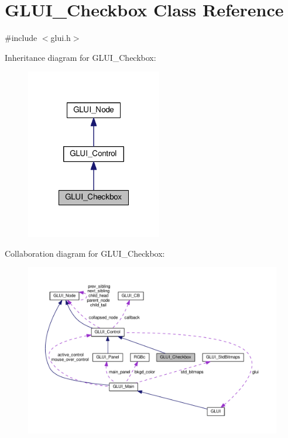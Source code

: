 \hypertarget{class_g_l_u_i___checkbox}{\section{G\+L\+U\+I\+\_\+\+Checkbox Class Reference}
\label{class_g_l_u_i___checkbox}
}


{\ttfamily \#include $<$glui.\+h$>$}



Inheritance diagram for G\+L\+U\+I\+\_\+\+Checkbox\+:\nopagebreak
\begin{figure}[H]
\begin{center}
\leavevmode
\includegraphics[width=168pt]{class_g_l_u_i___checkbox__inherit__graph}
\end{center}
\end{figure}


Collaboration diagram for G\+L\+U\+I\+\_\+\+Checkbox\+:\nopagebreak
\begin{figure}[H]
\begin{center}
\leavevmode
\includegraphics[width=350pt]{class_g_l_u_i___checkbox__coll__graph}
\end{center}
\end{figure}
